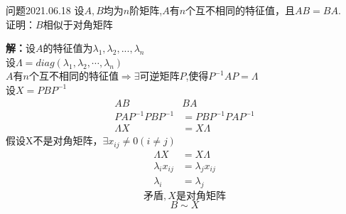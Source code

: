 \begin{mybox}{问题2021.06.18}
	\qquad 设$A,B$均为$n$阶矩阵,$A$有$n$个互不相同的特征值，且$AB=BA$.\\
	证明：$B$相似于对角矩阵
\end{mybox}	
\noindent 
\textbf{解：}设$A$的特征值为$\lambda_{1},\lambda_{2},...,\lambda_{n}$\\
设$\Lambda=diag(\lambda_{1},\lambda_{2},\cdots,\lambda_{n})$\\
$A$有$n$个互不相同的特征值$\Rightarrow \exists$可逆矩阵$P$,使得$P^{-1}AP=\Lambda$\\
设$X=PBP^{-1}$
\begin{align*}
AB&BA\\
PAP^{-1}PBP^{-1}&=PBP^{-1}PAP^{-1}\\
\Lambda X&=X\Lambda	
\end{align*}
假设X不是对角矩阵，$\exists x_{ij}\neq 0(i\neq j)$
\begin{align*}
	\Lambda X&=X\Lambda	\\
	\lambda_{i}x_{ij}&=\lambda_{j}x_{ij}\\
	\lambda_{i}&=\lambda_{j}
\end{align*}
$$\text{矛盾},X\text{是对角矩阵}$$
$$B\sim X$$